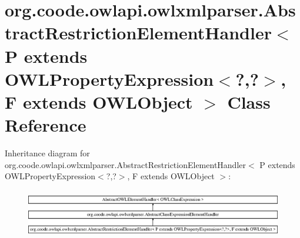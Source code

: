 \hypertarget{classorg_1_1coode_1_1owlapi_1_1owlxmlparser_1_1_abstract_restriction_element_handler_3_01_p_01ex1af432a427073023608ad4746636c054}{\section{org.\-coode.\-owlapi.\-owlxmlparser.\-Abstract\-Restriction\-Element\-Handler$<$ P extends O\-W\-L\-Property\-Expression$<$?,?$>$, F extends O\-W\-L\-Object $>$ Class Reference}
\label{classorg_1_1coode_1_1owlapi_1_1owlxmlparser_1_1_abstract_restriction_element_handler_3_01_p_01ex1af432a427073023608ad4746636c054}
}
Inheritance diagram for org.\-coode.\-owlapi.\-owlxmlparser.\-Abstract\-Restriction\-Element\-Handler$<$ P extends O\-W\-L\-Property\-Expression$<$?,?$>$, F extends O\-W\-L\-Object $>$\-:\begin{figure}[H]
\begin{center}
\leavevmode
\includegraphics[height=2.137405cm]{classorg_1_1coode_1_1owlapi_1_1owlxmlparser_1_1_abstract_restriction_element_handler_3_01_p_01ex1af432a427073023608ad4746636c054}
\end{center}
\end{figure}
